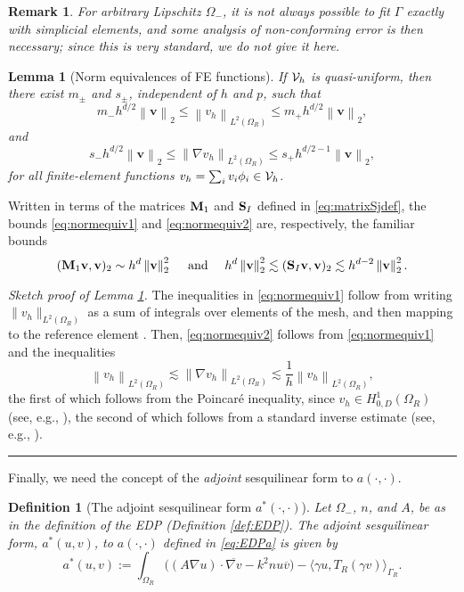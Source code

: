 \documentclass[10pt]{article}%
\newtheorem{definition}[theorem]{Definition}
\newenvironment{proof}[1][Proof]{\noindent \emph{#1.} }
{\hfill \ \rule{0.5em}{0.5em}}
\newtheorem{lemma}[theorem]{Lemma}
\newtheorem{remark}[theorem]{Remark}
\numberwithin{equation}{section}
\newcommand{\beq}{\begin{equation}}
\newcommand{\eeq}{\end{equation}}
\newcommand{\beqs}{\begin{equation*}}
\newcommand{\eeqs}{\end{equation*}}
\newcommand{\bre}{\begin{remark}}
\newcommand{\ere}{\end{remark}}
\newcommand{\bpf}{\begin{proof}}
\newcommand{\epf}{\end{proof}}
\newcommand{\ble}{\begin{lemma}}
\newcommand{\ele}{\end{lemma}}
\newcommand{\cV}{{\cal V}}
\newcommand{\bv}{\mathbf{v}}
\newcommand{\Oi}{{\Omega_-}}
\newcommand{\OR}{{\Omega_R}}
\newcommand{\gu}{\nabla u}
\newcommand{\gvb}{\overline{\nabla v}}
\newcommand{\vb}{\overline{v}}
\newcommand{\HoDk}{{H^1_{0,D}(\domain_R)}}
\newcommand*{\N}[1]{\left\|#1\right\|}
\newcommand{\tand}{\text{ and }}
\newcommand{\domain}{\Omega}
\newcommand{\matrixS}{{\bf S}}
\newcommand{\matrixM}{{\bf M}}
\newcommand{\coeffA}{A}
\newcommand{\coeffn}{n}
\begin{document}
\bre
For arbitrary Lipschitz $\Oi$, it is not always possible to fit $\Gamma$ exactly with simplicial elements, and some analysis of non-conforming error is then necessary; since this is very standard, we do not give it here.
\ere

\ble[Norm equivalences of FE functions]\label{lem:normequiv}
 If $\cV_h$ is quasi-uniform, then
there exist $m_\pm$ and $s_\pm$, independent of $h$ and $p$, such that
\beq\label{eq:normequiv1}
m_- h^{d/2} \N{\bv}_2 \leq \N{v_h}_{L^2(\OR)} \leq m_+ h^{d/2} \N{\bv}_2,
\eeq
and
\beq\label{eq:normequiv2}
s_- h^{d/2} \N{\bv}_2 \leq \N{\nabla v_h}_{L^2(\OR)} \leq s_+ h^{d/2-1} \N{\bv}_2,
\eeq
for all finite-element functions $v_h =\sum_i v_i \phi_i \in \cV_h$.
\ele

Written in terms of the matrices $\matrixM_1$ and $\matrixS_I$ defined in \eqref{eq:matrixSjdef}, the bounds \eqref{eq:normequiv1} and \eqref{eq:normequiv2} are, respectively, the familiar bounds
\beqs
(\matrixM_1 \bv,\bv)_2 \sim h^d \N{\bv}^2_2 \quad\tand\quad h^{d}\N{\bv}^2_2 \lesssim (\matrixS_I \bv,\bv)_2 \lesssim h^{d-2} \N{\bv}^2_2.
\eeqs

\bpf[Sketch proof of Lemma \ref{lem:normequiv}]
The inequalities in \eqref{eq:normequiv1} follow from writing $\|v_h\|_{L^2(\OR)}$ as a sum of integrals over elements of the mesh, and then mapping to the reference element .
Then, \eqref{eq:normequiv2} follows from \eqref{eq:normequiv1} and the inequalities
\beqs
\N{v_h}_{L^2(\Omega_R)}\lesssim \N{\nabla v_h}_{L^2(\Omega_R)}\lesssim \frac{1}{h} \N{v_h}_{L^2(\Omega_R)},
\eeqs
the first of which follows from the Poincar\'e inequality, since $v_h \in \HoDk$
(see, e.g., \cite[Proposition 5.3.4]{BrSc:00}), the second of which follows from a standard inverse estimate (see, e.g., \cite[Theorem 4.5.11]{BrSc:00}).
\epf


Finally, we need the concept of the \emph{adjoint} sesquilinear form to $a(\cdot,\cdot)$.

\begin{definition}[The adjoint sesquilinear form $a^*(\cdot,\cdot)$]\label{def:adjoint}
Let $\Oi$, $n$, and $A$, be as in the definition of the EDP (Definition \ref{def:EDP}). The adjoint sesquilinear form, $a^*(u,v)$, to $a(\cdot,\cdot)$ defined in \eqref{eq:EDPa} is given by
\beq\label{eq:EDPadjoint}
a^*(u,v) := \int_{\domain_R} 
\Big((\coeffA \gu)\cdot\gvb
 - k^2 \coeffn u\vb\Big) - \big\langle \gamma u,T_R(\gamma v)\big\rangle_{\Gamma_R}.
\eeq
\end{definition}
\end{document}
